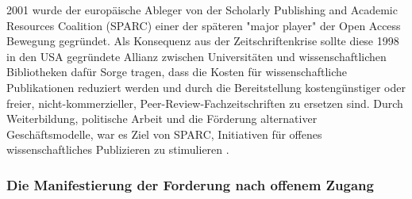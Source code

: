 2001 wurde der europäische Ableger von der Scholarly Publishing and Academic Resources Coalition (SPARC) einer der späteren "major player" der Open Access Bewegung \cite{russell2008business} \cite{Herb_2012} gegründet. Als Konsequenz aus der Zeitschriftenkrise sollte diese 1998 in den USA gegründete Allianz zwischen Universitäten und wissenschaftlichen Bibliotheken dafür Sorge tragen, dass die Kosten für wissenschaftliche Publikationen reduziert werden und durch die Bereitstellung kostengünstiger oder freier, nicht-kommerzieller, Peer-Review-Fachzeitschriften zu ersetzen sind. Durch Weiterbildung, politische Arbeit und die Förderung alternativer Geschäftsmodelle, war es Ziel von SPARC, Initiativen für offenes wissenschaftliches Publizieren zu stimulieren \cite{suchen}.

\subsubsection{Die Manifestierung der Forderung nach offenem Zugang}

